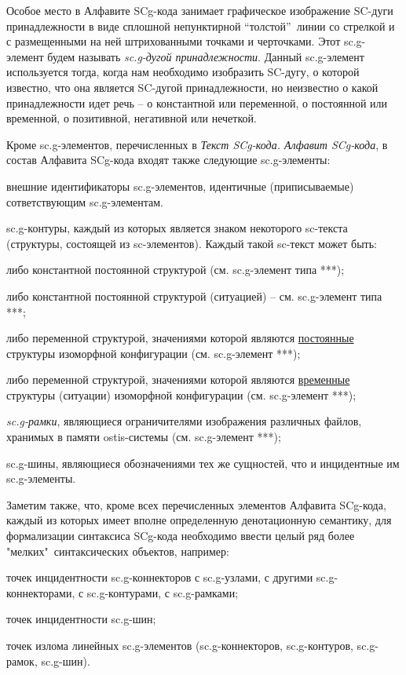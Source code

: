 \begin{SCn}
{Особое место в Алфавите SCg-кода занимает графическое изображение SC-дуги принадлежности в виде сплошной непунктирной “толстой”\ линии со стрелкой и с размещенными на ней штрихованными точками и черточками.
Этот sc.g-элемент будем называть \textit{sc.g-дугой принадлежности}.
Данный sc.g-элемент используется тогда, когда нам необходимо изобразить SC-дугу, о которой известно, что она является SC-дугой принадлежности, но неизвестно о какой принадлежности идет речь -- о константной или переменной, о постоянной или временной, о позитивной, негативной или нечеткой.

Кроме sc.g-элементов, перечисленных в \textit{Текст SCg-кода. Алфавит SCg-кода}, в состав Алфавита SCg-кода входят также следующие sc.g-элементы:
\begin{scnitemize}
\item внешние идентификаторы sc.g-элементов, идентичные (приписываемые) сответствующим sc.g-элементам.
\item sc.g-контуры, каждый из которых является знаком некоторого sc-текста (структуры, состоящей из sc-элементов). Каждый такой sc-текст может быть:
\begin{scnitemizeii}
\item либо константной постоянной структурой (см. sc.g-элемент типа ***);
\item либо константной постоянной структурой (ситуацией) -- см. sc.g-элемент типа ***;
\item либо переменной структурой, значениями которой являются \uline{постоянные} структуры изоморфной  конфигурации (см. sc.g-элемент ***);
\item либо переменной структурой, значениями которой являются \uline{временные} структуры (ситуации) изоморфной  конфигурации (см. sc.g-элемент ***);
\end{scnitemizeii}

\item \textit{sc.g-рамки}, являющиеся ограничителями изображения различных файлов, хранимых в памяти ostis-системы (см. sc.g-элемент ***);
\item sc.g-шины, являющиеся обозначениями тех же сущностей, что и инцидентные им sc.g-элементы.
\end{scnitemize}

Заметим также, что, кроме всех перечисленных элементов Алфавита SCg-кода, каждый из которых имеет вполне определенную денотационную  семантику, для формализации синтаксиса SCg-кода необходимо ввести целый ряд более "мелких"\ синтаксических объектов, например:
\begin{scnitemize}
\item точек инцидентности sc.g-коннекторов с sc.g-узлами, с другими sc.g-коннекторами, с sc.g-контурами, с sc.g-рамками;
\item точек инцидентности sc.g-шин;
\item точек излома линейных sc.g-элементов (sc.g-коннекторов, sc.g-контуров, sc.g-рамок, sc.g-шин).
\end{scnitemize}
}


\end{SCn}

